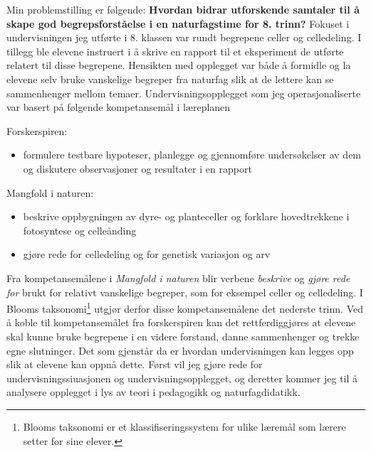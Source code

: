 \documentclass[main.tex]{subfiles}
\begin{document}
Min problemstilling er følgende:
\newline
\newline
\textbf{Hvordan bidrar utforskende samtaler til å skape god begrepsforståelse i en naturfagstime 
for 8. trinn?}
\newline
\newline
Fokuset i undervisningen jeg utførte i 8. klassen var rundt begrepene celler og celledeling. 
I tillegg ble elevene instruert i å skrive en rapport til et eksperiment de utførte relatert 
til disse begrepene. Hensikten med opplegget var både å formidle og la elevene selv bruke 
vanskelige begreper fra naturfag slik at de lettere kan se sammenhenger mellom temaer.
\newline
\newline
Undervisningsopplegget som jeg operasjonaliserte var basert på følgende kompetansemål i 
læreplanen
\begin{displayquote}
Forskerspiren:
\begin{itemize}
\vspace{-2mm}
\item formulere testbare hypoteser, planlegge og gjennomføre undersøkelser 
av dem og diskutere observasjoner og resultater i en rapport
\end{itemize}
Mangfold i naturen:
\begin{itemize}
\vspace{-2mm}
\item beskrive oppbygningen av dyre- og planteceller og forklare hovedtrekkene i fotosyntese 
og celleånding
\vspace{-2mm}
\item gjøre rede for celledeling og for genetisk variasjon og arv
\end{itemize}
\end{displayquote} 
Fra kompetansemålene i \emph{Mangfold i naturen} blir verbene \emph{beskrive} og \emph{gjøre rede 
for} brukt for relativt vanskelige begreper, som for eksempel celler og celledeling. I Blooms 
taksonomi\footnote[1]{Blooms taksonomi er et klassifiseringssystem for ulike læremål som lærere 
setter for sine elever.} utgjør derfor disse kompetansemålene det nederste trinn. Ved å koble til 
kompetansemålet fra forskerspiren kan det rettferdiggjøres at elevene skal kunne bruke begrepene 
i en videre forstand, danne sammenhenger og trekke egne slutninger. Det som gjenstår da er hvordan 
undervisningen kan legges opp slik at elevene kan oppnå dette. Først vil jeg gjøre rede for 
undervisningssiuasjonen og undervisningsopplegget, og deretter kommer jeg til å analysere 
opplegget i lys av teori i pedagogikk og naturfagdidatikk.
\end{document}
